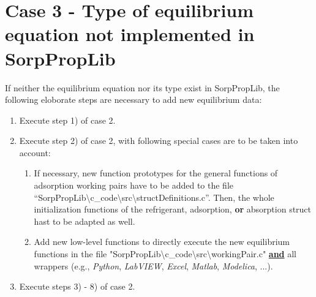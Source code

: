 \section{Case 3 - Type of equilibrium equation not implemented in SorpPropLib}
\label{cha:extensions:case3}
%
If neither the equilibrium equation nor its type exist in SorpPropLib, the following eloborate steps are necessary to add new equilibrium data:
\begin{enumerate}
	\item Execute step 1) of case 2.
	\item Execute step 2) of case 2, with following special cases are to be taken into account:
	\begin{enumerate}
		\item If necessary, new function prototypes for the general functions of adsorption working pairs have to be added to the file “SorpPropLib\textbackslash c\_code\textbackslash src\textbackslash \newline structDefinitions.c”. Then, the whole initialization functions of the refrigerant, adsorption, \textbf{or} absorption struct hast to be adapted as well.
		\item Add new low-level functions to directly execute the new equilibrium functions in the file "SorpPropLib\textbackslash c\_code\textbackslash src\textbackslash workingPair.c" \textbf{\underline{and}} all wrappers (e.g., \textit{Python}, \textit{LabVIEW}, \textit{Excel}, \textit{Matlab}, \textit{Modelica}, ...).
	\end{enumerate}
\item Execute steps 3) - 8) of case 2.
\end{enumerate}
